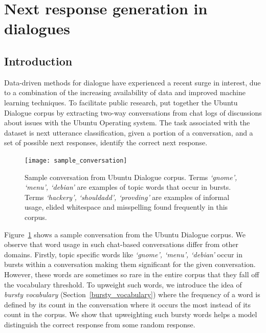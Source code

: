 \documentclass[11pt]{report}
\renewcommand\cite{\citep}	%
\begin{document}
\section{Next response generation in dialogues}

\subsection{Introduction}
Data-driven methods for dialogue have experienced a recent surge in interest, due to a combination of the increasing availability of data and improved machine learning techniques.  To facilitate public research, \cite{lowe2015ubuntu} put together the Ubuntu Dialogue corpus by extracting two-way conversations from chat logs of discussions about issues with the Ubuntu Operating system. The task associated with the dataset is next utterance classification, given a portion of a conversation, and a set of possible next responses, identify the correct next response.

\begin{figure}
\texttt{[image: sample\_conversation]}
\caption{Sample conversation from Ubuntu Dialogue corpus. Terms \textit{`gnome', `menu', `debian'} are examples of topic words that occur in bursts. Terms \textit{`hackery', `shouldadd', `provding'} are examples of informal usage, elided whitespace and misspelling found frequently in this corpus.}
\label{sample_conversation}
\vspace{-1.0em}
\end{figure}

Figure~\ref{sample_conversation} shows a sample conversation from the Ubuntu Dialogue corpus. We observe that word usage in such chat-based conversations differ from other domains. Firstly, topic specific words like \textit{`gnome', `menu', `debian'} occur in bursts within a conversation making them significant for the given conversation. However, these words are sometimes so rare in the entire corpus that they fall off the vocabulary threshold. To upweight such words, we introduce the idea of \textit{bursty vocabulary} (Section~\ref{bursty_vocabulary}) where the frequency of a word is defined by its count in the conversation where it occurs the most instead of its count in the corpus. We show that upweighting such bursty words helps a model distinguish the correct response from some random response. %
\end{document}
